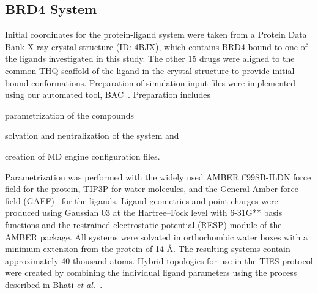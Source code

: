 \documentclass[conference]{IEEEtran}
\begin{document}
\subsection{BRD4 System}\label{sec:system_description}

Initial coordinates for the protein-ligand system were taken from a Protein 
Data Bank X-ray crystal structure (ID: 4BJX), which contains BRD4 bound to one of 
the ligands investigated in this study.
The other 15 drugs were aligned to the common THQ scaffold of the ligand in the 
crystal structure to provide initial bound conformations.
Preparation of simulation input files were implemented using our automated tool, 
BAC~\cite{Sadiq2008}. Preparation includes
\begin{enumerate*}[label=(\roman*)]
  \item parametrization of the compounds
  \item solvation and neutralization of the system and
  \item creation of MD engine configuration files.
\end{enumerate*}
Parametrization was performed with the widely used AMBER ff99SB-ILDN force field  
for the protein, TIP3P for water molecules, and the General Amber force field 
(GAFF)~\cite{Wang2004} for the ligands. Ligand geometries and point charges 
were produced using Gaussian 03 at the Hartree–Fock level with 6-31G** basis 
functions and the restrained electrostatic potential (RESP) module of the AMBER 
package. All systems were solvated in orthorhombic water boxes with a minimum 
extension from the protein of 14 \AA. The resulting systems contain 
approximately 40 thousand atoms.
Hybrid topologies for use in the TIES protocol were created by combining the 
individual ligand parameters using the process described in Bhati 
\textit{et al.}~\cite{Bhati2017}.






\end{document}
